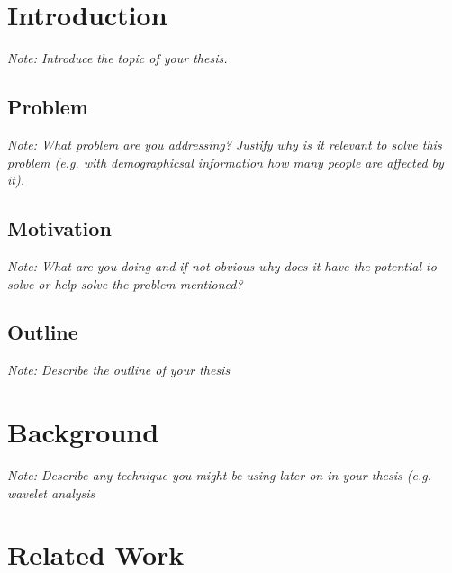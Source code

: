 \documentclass[a4paper,12pt,twoside]{report}
\begin{document}
\clearpage



\tableofcontents
\clearpage

\clearpage


\fancyhead{}
\pagestyle{fancy}
\fancyhead[LE]{\slshape \leftmark}
\fancyhead[RO]{\slshape \rightmark}
\headheight=15pt





\chapter{Introduction}

\textit{Note: Introduce the topic of your thesis.}

\section{Problem}

\textit{Note: What problem are you addressing? Justify why is it relevant to solve this problem (e.g. with demographicsal information how many people are affected by it). }

\section{Motivation}

\textit{Note: What are you doing and if not obvious why does it have the potential to solve or help solve the problem mentioned?}

\section{Outline}

\textit{Note: Describe the outline of your thesis}



\chapter{Background}

\textit{Note: Describe any technique you might be using later on in your thesis (e.g. wavelet analysis}


\chapter{Related Work}
\end{document}
